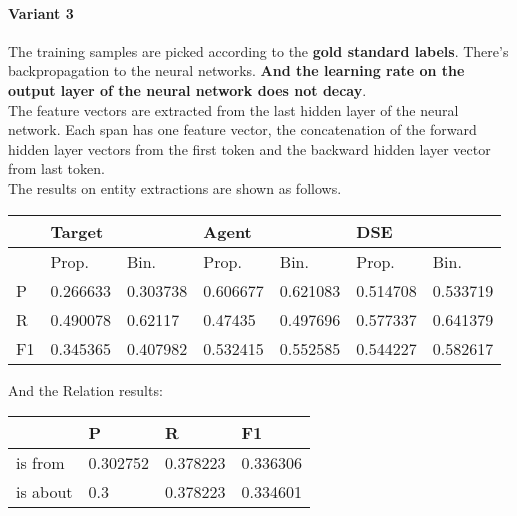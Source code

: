 \documentclass[a4paper, 12pt]{article}
\begin{document}
\paragraph{Variant 3}
The training samples are picked according to the \textbf{gold standard labels}. 
There's backpropagation to the neural networks. \textbf{And the learning rate on the output
layer of the neural network does not decay}.\\
The feature vectors are extracted from the last hidden layer of the neural
network. Each span has one feature vector, the concatenation of the forward hidden
layer vectors from the first token and the backward hidden layer vector from last token.\\
The results on entity extractions are shown as follows.\\
\begin{table}[h!]
\centering
\begin{tabular}{l|ll|ll|ll}
\hline
   & \multicolumn{2}{l}{Target} & \multicolumn{2}{l}{Agent} & \multicolumn{2}{l}{DSE} \\ \hline
   & Prop.& Bin.& Prop.& Bin.& Prop.& Bin.\\
 \hline
P  &0.266633&0.303738 &0.606677 & 0.621083 &0.514708 & 0.533719 \\
R  &0.490078& 0.62117 & 0.47435 & 0.497696 &0.577337 & 0.641379 \\
F1 &0.345365&0.407982 &0.532415 & 0.552585 &0.544227 & 0.582617 \\ \hline
\end{tabular}
\end{table}

And the Relation results:
\begin{table}[h!]
\centering
\begin{tabular}{l|l|l|l}
\hline
         & P & R & F1    \\\hline
is from  & 0.302752& 0.378223& 0.336306 \\
is about & 0.3& 0.378223& 0.334601 \\
\hline
\end{tabular}
\end{table}
\end{document}
